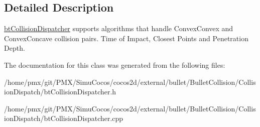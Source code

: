 \subsection{Detailed Description}
\hyperlink{classbtCollisionDispatcher}{bt\+Collision\+Dispatcher} supports algorithms that handle Convex\+Convex and Convex\+Concave collision pairs. Time of Impact, Closest Points and Penetration Depth. 

The documentation for this class was generated from the following files\+:\begin{DoxyCompactItemize}
\item 
/home/pmx/git/\+P\+M\+X/\+Simu\+Cocos/cocos2d/external/bullet/\+Bullet\+Collision/\+Collision\+Dispatch/bt\+Collision\+Dispatcher.\+h\item 
/home/pmx/git/\+P\+M\+X/\+Simu\+Cocos/cocos2d/external/bullet/\+Bullet\+Collision/\+Collision\+Dispatch/bt\+Collision\+Dispatcher.\+cpp\end{DoxyCompactItemize}
